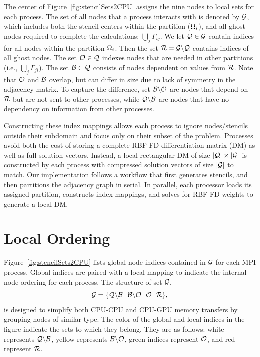 \documentclass{report}
\begin{document}
        
       
The center of Figure~\ref{fig:stencilSets2CPU} assigns the nine nodes to local sets for each process. The set of all nodes that a process interacts with is denoted by $\mathcal{G}$, which includes both the stencil centers within the partition ($\Omega_i$), and all ghost nodes required to complete the calculations: $\bigcup_{j} \Gamma_{ij}$.  
We let $\mathcal{Q}\in\mathcal{G}$ contain indices for all nodes within the partition $\Omega_i$. 
Then the set $\mathcal{R} = \mathcal{G} \backslash \mathcal{Q}$ contains indices of all ghost nodes. 
The set $\mathcal{O}\in\mathcal{Q}$ indexes nodes that are needed in other partitions (i.e., $\bigcup_j \Gamma_{ji}$). The set $\mathcal{B}\in\mathcal{Q}$ consists of nodes dependent on values from $\mathcal{R}$. Note that $\mathcal{O}$ and $\mathcal{B}$ overlap, but can differ in size due to lack of symmetry in the adjacency matrix. To capture the difference, set $\mathcal{B} \backslash \mathcal{O}$ are nodes that depend on $\mathcal{R}$ but are not sent to other processes, while $\mathcal{Q} \backslash \mathcal{B}$ are nodes that have no dependency on information from other processes.

Constructing these index mappings allows each process to ignore nodes/stencils outside their subdomain and focus only on their subset of the problem. Processes avoid both the cost of storing a complete RBF-FD differentiation matrix (DM) as well as full solution vectors. Instead, a local rectangular DM of size $|\mathcal{Q}| \times |\mathcal{G}|$ is constructed by each process with compressed solution vectors of size $|\mathcal{G}|$ to match. Our implementation follows a workflow that first generates stencils, and then partitions the adjacency graph in serial. In parallel, each processor loads its assigned partition, constructs index mappings, and solves for RBF-FD weights to generate a local DM.  

\section{Local Ordering}

Figure~\ref{fig:stencilSets2CPU} lists global node indices contained in $\mathcal{G}$ for each MPI process. Global indices are paired with a local mapping to indicate the internal node ordering for each process. The structure of set $\mathcal{G}$,
   \begin{equation}
 		\setAllNodes = \{ \mathcal{Q}\backslash\mathcal{B} \ \ \mathcal{B}\backslash\mathcal{O} \ \ \mathcal{O} \ \ \setDepend \},
            \label{eq:decompose_g}
        \end{equation}
 is designed to simplify both CPU-CPU and CPU-GPU memory transfers by grouping nodes of similar type. The color of the global and local indices in the figure
 indicate the sets to which they belong. They are as follows: white represents $\mathcal{Q} \backslash \mathcal{B}$, 
 yellow represents $\mathcal{B} \backslash \mathcal{O}$, green indices 
 represent $\mathcal{O}$, and red represent $\mathcal{R}$.  
\end{document}
